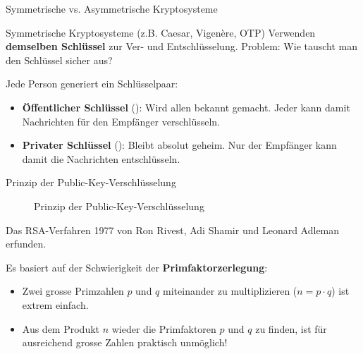 \begin{frame}{Symmetrische vs. Asymmetrische Kryptosysteme}
	\begin{block}{Symmetrische Kryptosysteme (z.B. Caesar, Vigenère, OTP)}
		Verwenden \textbf{demselben Schlüssel} zur Ver- und Entschlüsselung. Problem: Wie tauscht man den Schlüssel sicher aus?
	\end{block}

	\pause
	\begin{myidea}
		Jede Person generiert ein Schlüsselpaar:
		\begin{itemize}[<+->]
			\item \textbf{Öffentlicher Schlüssel} (): Wird allen bekannt gemacht. Jeder kann damit Nachrichten für den Empfänger verschlüsseln.
			\item \textbf{Privater Schlüssel} (): Bleibt absolut geheim. Nur der Empfänger kann damit die Nachrichten entschlüsseln.
		\end{itemize}
	\end{myidea}
\end{frame}

\begin{frame}{Prinzip der Public-Key-Verschlüsselung}
	\begin{figure}[H]
		\centering
		\resizebox{!}{0.75\textheight}{}
		\caption{Prinzip der Public-Key-Verschlüsselung}
	\end{figure}
\end{frame}

\begin{frame}{Das RSA-Verfahren}
	1977 von Ron Rivest, Adi Shamir und Leonard Adleman erfunden.

	\begin{mydefinition}
		Es basiert auf der Schwierigkeit der \textbf{Primfaktorzerlegung}:
		\begin{itemize}
			\item Zwei grosse Primzahlen $p$ und $q$ miteinander zu multiplizieren ($n = p \cdot q$) ist extrem einfach.
			\item Aus dem Produkt $n$ wieder die Primfaktoren $p$ und $q$ zu finden, ist für ausreichend grosse Zahlen praktisch unmöglich!
		\end{itemize}
	\end{mydefinition}
\end{frame}

